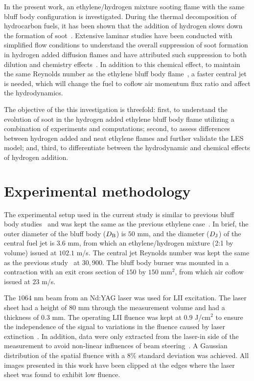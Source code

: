 \documentclass[review,3p,times]{elsarticle}
\begin{document}
In the present work, an ethylene/hydrogen mixture sooting flame with the same bluff body configuration is investigated.  During the thermal decomposition of hydrocarbon fuels, it has been shown that the addition of hydrogen slows down the formation of soot~\cite{tesner58}.  Extensive laminar studies have been conducted with simplified flow conditions to understand the overall suppression of soot formation in hydrogen added diffusion flames and have attributed such suppression to both dilution and chemistry effects~\cite{dearden68,du95,gulder96,guo06,zhao14}.  In addition to this chemical effect, to maintain the same Reynolds number as the ethylene bluff body flame~\cite{mueller13}, a faster central jet is needed, which will change the fuel to coflow air momentum flux ratio and affect the hydrodynamics.

The objective of the this investigation is threefold: first, to understand the evolution of soot in the hydrogen added ethylene bluff body flame utilizing a combination of experiments and computations; second, to assess differences between hydrogen added and neat ethylene flames and further validate the LES model; and, third, to differentiate between the hydrodynamic and chemical effects of hydrogen addition.



\section{Experimental methodology}

The experimental setup used in the current study is similar to previous bluff body studies~\cite{dally96,dally98a} and was kept the same as the previous ethylene case~\cite{mueller13}.  In brief, the outer diameter of the bluff body ($D_{\rm B}$) is $50$ mm, and the diameter ($D_{\rm J}$) of the central fuel jet is $3.6$ mm, from which an ethylene/hydrogen mixture (2:1 by volume) issued at $102.1$ m/s.  The central jet Reynolds number was kept the same as the previous study~\cite{mueller13} at $30,900$.  The bluff body burner was mounted in a contraction with an exit cross section of $150$ by $150$ mm$^2$, from which air coflow issued at $23$ m/s.  

The $1064$ nm beam from an Nd:YAG laser was used for LII excitation.  The laser sheet had a height of $80$ mm through the measurement volume and had a thickness of $0.3$ mm.  The operating LII fluence was kept at $0.9$ J/cm$^2$ to ensure the independence of the signal to variations in the fluence caused by laser extinction~\cite{qamar09,schulz06}.  In addition, data were only extracted from the laser-in side of the measurement to avoid non-linear influences of beam steering~\cite{sun15}.  A Gaussian distribution of the spatial fluence with a $8$\% standard deviation was achieved.  All images presented in this work have been clipped at the edges where the laser sheet was found to exhibit low fluence.   
\end{document}
